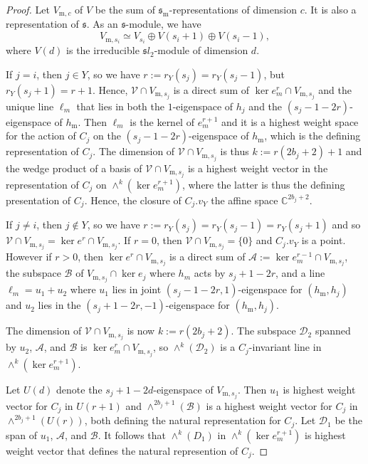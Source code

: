 \documentclass{amsart}
\theoremstyle{definition}
\newcommand{\C}{\mathbb{C}}
\newcommand{\m}{\mathrm{m}}
\newcommand{\fs}{\mathfrak{s}}
\newcommand{\0}{\mathcal{O}}
\begin{document}
\begin{proof}
Let $V_{\m,c}$ of $V$ be the sum of $\fs_\m$-representations
of dimension $c$.  It is also a representation of $\fs$.
As an $\fs$-module, we have 
$$V_{\m,s_i} \simeq V_{s_i} \oplus V(s_i+1)\oplus V(s_i-1),$$
where $V(d)$ is the irreducible $\mathfrak sl_2$-module of dimension $d$.

If $j = i$, then  
$j \in Y$, so we have $r:=r_Y(s_j)=r_Y(s_j-1)$, but $r_Y(s_j+1)=r+1$.
Hence, $\mathcal V \cap  V_{\m,s_j}$
is a direct sum of $\ker e_m^{r} \cap V_{\m,s_j}$ and 
the unique line $\ell_m$ that lies in both the $1$-eigenspace of $h_j$ and 
the $(s_j-1-2r)$-eigenspace of $h_\m$.  Then $\ell_m$
is the kernel of $e_m^{r+1}$ and it is a highest weight space for the action of $C_j$ on the $(s_j-1-2r)$-eigenspace of $h_\m$, which is the defining representation of $C_j$.  
The dimension of $\mathcal V \cap  V_{\m,s_j}$ is thus $k:=r(2b_j+2)+1$
and the wedge product of a basis of $\mathcal V \cap  V_{\m,s_j}$ is a highest weight vector in the representation of $C_j$ on $\wedge^k(\ker e_m^{r+1})$,
where the latter is thus the defining presentation of $C_j$.  
Hence, the closure of $C_j.v_Y$ the affine space $\C^{2b_j+2}$.

If $j \neq  i$, then  
$j \not \in Y$, so we have $r:=r_Y(s_j)=r_Y(s_j-1) = r_Y(s_j+1)$
and so $\mathcal V \cap  V_{\m,s_j} = \ker e^r \cap  V_{\m,s_j}$.
If $r=0$, then $\mathcal V \cap  V_{\m,s_j} = \{0\}$ and $C_j.v_Y$ is a
point.
However if $r>0$, then 
$\ker e^r \cap  V_{\m,s_j}$
is a direct sum of $\mathcal A:= \ker e_m^{r-1} \cap V_{\m,s_j}$, 
the subspace $\mathcal B$ of $V_{\m,s_j} \cap \ker e_j$
where $h_m$ acts by $s_j+1-2r$, 
and a line 
$\ell_m =u_1+u_2$ where $u_1$ lies
in joint $(s_j-1-2r, 1)$-eigenspace for $(h_\m,h_j)$
and $u_2$ lies in the $(s_j+1-2r, -1)$-eigenspace for $(h_\m,h_j)$.

The dimension of $\mathcal V \cap  V_{\m,s_j}$ is now $k:=r(2b_j+2)$.
The subspace $\mathcal D_2$ spanned by $u_2$, $\mathcal A$, and $\mathcal B$
is $\ker e_m^{r} \cap V_{\m,s_j}$, so $\wedge^k (\mathcal D_2)$ is
a $C_j$-invariant 
line in $\wedge^k(\ker e_m^{r+1})$.   

Let $U(d)$ denote the $s_j+1-2d$-eigenspace of $V_{\m,s_j}$.
Then $u_1$ is highest weight vector for $C_j$ in $U(r+1)$  
and $\wedge^{2b_j+1}(\mathcal B)$ is a highest weight
vector for $C_j$ in $\wedge^{2b_j+1}(U(r))$, both defining
the natural representation for $C_j$.
Let $\mathcal D_1$ be the span of $u_1$,  $\mathcal A$, and $\mathcal B$.
It follows that $\wedge^k(D_1)$ in $\wedge^k(\ker e_m^{r+1})$
is highest weight vector that defines the natural represention of $C_j$.
\end{proof}
\end{document}
